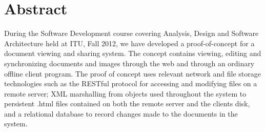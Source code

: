 \section{Abstract}
\newpage
During the Software Development course covering Analysis, Design and Software Architecture held at ITU, Fall 2012, we have developed a proof-of-concept for a document viewing and sharing system. The concept contains viewing, editing and synchronizing documents and images through the web and through an ordinary offline client program. The proof of concept uses relevant network and file storage technologies such as the RESTful protocol for accessing and modifying files on a remote server; XML marshalling from objects used throughout the system to persistent .html files contained on both the remote server and the clients disk, and a relational database to record changes made to the documents in the system.